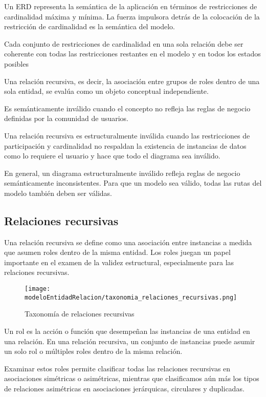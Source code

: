 Un ERD representa la semántica de la aplicación en términos de restricciones de cardinalidad máxima y mínima. La fuerza impulsora detrás de la colocación de la restricción de cardinalidad es la semántica del modelo.


Cada conjunto de restricciones de cardinalidad en una sola relación debe ser coherente con todas las restricciones restantes en el modelo y en todos los estados posibles


Una relación recursiva, es decir, la asociación entre grupos de roles dentro de una sola entidad, se evalúa como un objeto conceptual independiente. 


Es semánticamente inválido cuando el concepto no refleja las reglas de negocio definidas por la comunidad de usuarios. 


Una relación recursiva es estructuralmente inválida cuando las restricciones de participación y cardinalidad no respaldan la existencia de instancias de datos como lo requiere el usuario y hace que todo el diagrama sea inválido.


En general, un diagrama estructuralmente inválido refleja reglas de negocio semánticamente inconsistentes. Para que un modelo sea válido, todas las rutas del modelo también deben ser válidas.


\subsection{Relaciones recursivas}

Una relación recursiva se define como una asociación entre instancias a medida que asumen roles dentro de la misma entidad. Los roles juegan un papel importante en el examen de la validez estructural, especialmente para las relaciones recursivas.

\begin{figure}[h!t] 
    \centering
    \texttt{[image: modeloEntidadRelacion/taxonomia\_relaciones\_recursivas.png]}
    \caption{Taxonomía de relaciones recursivas}
    \label{img:taxonomia_relaciones_recursivas}
\end{figure}

Un rol es la acción o función que desempeñan las instancias de una entidad en una relación.
En una relación recursiva, un conjunto de instancias puede asumir un solo rol o múltiples roles dentro de la misma relación. 


Examinar estos roles permite clasificar todas las relaciones recursivas en asociaciones simétricas o asimétricas, mientras que clasificamos aún más los tipos de relaciones asimétricas en asociaciones jerárquicas, circulares y duplicadas.


